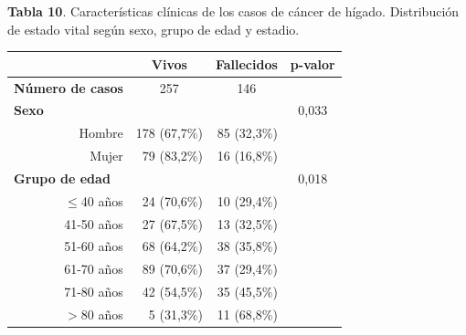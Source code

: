 \textbf{Tabla 10}. Características clínicas de los casos de cáncer de hígado. Distribución de  estado vital según sexo, grupo de edad y estadio.

\begin{table}[H]
	\centering
	\begin{tabular}{rrrc}
		\cline{2-4}
		\multicolumn{1}{l}{}                           & \multicolumn{1}{c}{\textbf{Vivos}} & \multicolumn{1}{c}{\textbf{Fallecidos}} & \multicolumn{1}{l}{\textbf{p-valor}} \\ \hline
		\multicolumn{1}{l}{\textbf{Número de casos}} & \multicolumn{1}{c}{257}            & \multicolumn{1}{c}{146}     & \multicolumn{1}{l}{}                     \\ \hline
		\multicolumn{1}{l}{\textbf{Sexo}}              &                           &                             & 0,033                                    \\
		Hombre                                         & 178 (67,7\%)              & 85 (32,3\%)                 &                                          \\
		Mujer                                          & 79 (83,2\%)               & 16 (16,8\%)                 &                                          \\ \hline
		\multicolumn{1}{l}{\textbf{Grupo de edad}}     &                           &                             & 0,018                                    \\
		$\leq$40 años                                      & 24 (70,6\%)               & 10 (29,4\%)                 &                                          \\
		41-50 años                                     & 27 (67,5\%)               & 13 (32,5\%)                 &                                          \\
		51-60 años                                     & 68 (64,2\%)               & 38 (35,8\%)                 &                                          \\
		61-70 años                                     & 89 (70,6\%)               & 37 (29,4\%)                 &                                          \\
		71-80 años                                     & 42 (54,5\%)               & 35 (45,5\%)                 &                                          \\
		$>$80 años                                   & 5 (31,3\%)                & 11 (68,8\%)                 &                                          \\ \hline

\end{tabular}
\end{table}
